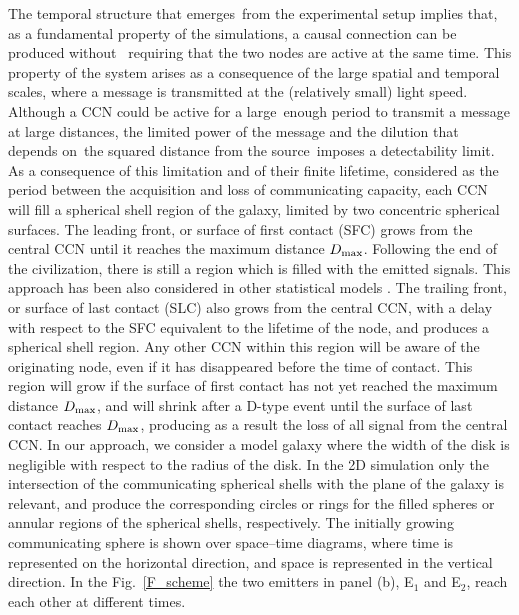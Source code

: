 \documentclass[crop]{CSLB}
\newcommand{\ceti}{CCN}
\begin{document}

The temporal structure that emerges from the experimental setup implies that, as a fundamental property of the simulations, a causal connection can be produced without 
requiring that the two nodes are active at the same time.
%
This property of the system arises as a consequence of the large spatial and temporal scales, where a message is transmitted at the (relatively small) light speed.
%
Although a \ceti{} could be active for a large enough period to transmit a message at large distances, the limited power of the message and the dilution that depends on the squared distance from the source imposes a detectability limit.
%
As a consequence of this limitation and of their finite lifetime, considered as the period between the acquisition and loss of communicating capacity, each \ceti{} will fill a spherical shell region of the galaxy, limited by two concentric spherical surfaces.
%
The leading front, or surface of first contact (SFC) grows from the
central \ceti{} until it reaches the maximum distance $D_{\rm max}$.
%
Following the end of the civilization, there is still a region which is filled with the emitted signals.
%
This approach has been also considered in other statistical models \citep[e.g., ][]{smith_broadcasting_2009, grimaldi_signal_2017, Grimaldi2018}.
%
The trailing front, or surface of last contact (SLC) also grows from the central \ceti{}, with a delay with respect to the SFC equivalent to the lifetime of the node, and produces a spherical shell region.
%
Any other \ceti{} within this region will be aware of the originating node, even if it has disappeared before the time of contact.
%
This region will grow if the surface of first contact has not yet
reached the maximum distance $D_{\rm max}$, and will shrink after a
D-type event until the surface of last contact reaches $D_{\rm max}$, producing as a result the loss of all signal from the central \ceti{}.
%
In our approach, we consider a model galaxy where the width of the disk is negligible with respect to the radius of the disk.
%
In the 2D simulation only the intersection of the communicating spherical shells with the plane of the galaxy is relevant, and produce the corresponding circles or rings for the filled spheres or annular regions of the spherical shells, respectively.
%
The initially growing communicating sphere is shown over space--time diagrams, where time is represented on the horizontal direction, and space is represented in the vertical direction.
%
In the Fig.~\ref{F_scheme} the two emitters in panel (b), E$_1$ and E$_2$, reach each other at different times.
\end{document}
